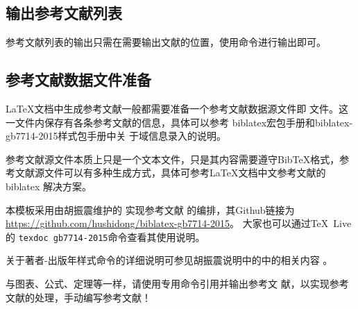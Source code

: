 \subsection{输出参考文献列表}

参考文献列表的输出只需在需要输出文献的位置，使用命令进行输出即可。

\subsection{参考文献数据文件准备}

\LaTeX 文档中生成参考文献一般都需要准备一个参考文献数据源文件即
文件。这一文件内保存有各条参考文献的信息，具体可以参考
biblatex宏包手册和biblatex-gb7714-2015样式包手册\cite{胡振震2019}中关
于域信息录入的说明。

参考文献源文件本质上只是一个文本文件，只是其内容需要遵守BibTeX格式，参
考文献源文件可以有多种生成方式，具体可参考\LaTeX{}文档中文参考文献的
biblatex 解决方案\parencite[2.2节]{胡振震2016}。


本模板采用由胡振震维护的
实现参考文献
的编排\cite{胡振震2019}，其Github链接为
\url{https://github.com/hushidong/biblatex-gb7714-2015}。
大家也可以通过\TeX~Live的 \verb|texdoc gb7714-2015|命令查看其使用说明。

关于著者-出版年样式命令的详细说明可参见胡振震说明中的中的相关内容
\parencite[2.2、2.3节]{胡振震2016}。

与图表、公式、定理等一样，请使用专用命令引用并输出参考文
献，以实现参考文献的处理，手动编写参考文献！


